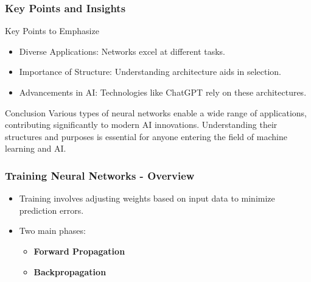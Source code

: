 \documentclass[aspectratio=169]{beamer}
\begin{document}
\begin{frame}[fragile]
    \frametitle{Key Points and Insights}

    \begin{block}{Key Points to Emphasize}
        \begin{itemize}
            \item Diverse Applications: Networks excel at different tasks.
            \item Importance of Structure: Understanding architecture aids in selection.
            \item Advancements in AI: Technologies like ChatGPT rely on these architectures.
        \end{itemize}
    \end{block}
    
    \begin{block}{Conclusion}
        Various types of neural networks enable a wide range of applications, contributing significantly to modern AI innovations. Understanding their structures and purposes is essential for anyone entering the field of machine learning and AI.
    \end{block}
    
\end{frame}

\begin{frame}[fragile]
    \frametitle{Training Neural Networks - Overview}
    \begin{itemize}
        \item Training involves adjusting weights based on input data to minimize prediction errors.
        \item Two main phases:
        \begin{itemize}
            \item \textbf{Forward Propagation}
            \item \textbf{Backpropagation}
        \end{itemize}
    \end{itemize}
\end{frame}
\end{document}

